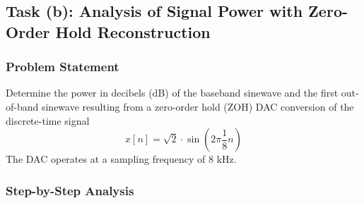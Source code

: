 
\item[(b)]
\subsection{Task (b): Analysis of Signal Power with Zero-Order Hold Reconstruction}

\subsubsection{Problem Statement}
Determine the power in decibels (dB) of the baseband sinewave and the first out-of-band sinewave resulting from a zero-order hold (ZOH) DAC conversion of the discrete-time signal
$$
x[n] = \sqrt{2} \cdot \sin\left(2\pi \frac{1}{8}n\right)
$$
The DAC operates at a sampling frequency of 8 kHz.

\subsubsection{Step-by-Step Analysis}

